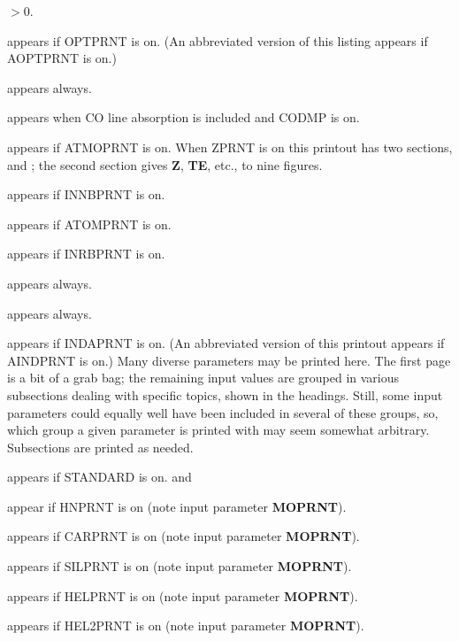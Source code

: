 $ > 0$.
\blankline
{} \par
appears if OPTPRNT is on. (An abbreviated version of this listing appears
if AOPTPRNT is on.)
\blankline
{} \par
appears always.
\blankline
{} \par
appears when CO line absorption is included and CODMP is on.
\blankline
{} \par
appears if ATMOPRNT is on. When ZPRNT is on this printout has two
sections,  and ; the
second section gives {\bf Z}, {\bf TE}, etc., to nine figures.
\blankline
{} \par
appears if INNBPRNT is on.
\blankline
{} \par
appears if ATOMPRNT is on.
\blankline
{} \par
appears if INRBPRNT is on.
\ej
{} \par
appears always.
\blankline
{} \par
appears always.
\blankline
{} \par
appears if INDAPRNT is on. (An abbreviated version of this printout
appears if AINDPRNT is on.) Many diverse parameters may be printed here.
The first page is a bit of a grab bag; the remaining input values are
grouped in various subsections dealing with specific topics, shown in
the headings. Still, some input parameters could equally well have been
included in several of these groups, so, which group a given parameter
is printed with may seem somewhat arbitrary. Subsections are printed
as needed.
\blankline
{} \par
appears if STANDARD is on.
\ej
{} and  \par
appear if HNPRNT is on (note input parameter {\bf MOPRNT}).
\blankline
{} \par
appears if CARPRNT is on (note input parameter {\bf MOPRNT}).
\blankline
{} \par
appears if SILPRNT is on (note input parameter {\bf MOPRNT}).
\blankline
{} \par
appears if HELPRNT is on (note input parameter {\bf MOPRNT}).
\blankline
{} \par
appears if HEL2PRNT is on (note input parameter {\bf MOPRNT}).
